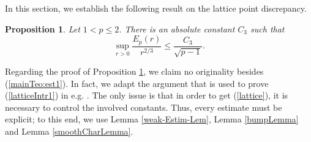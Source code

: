 \documentclass{amsart}
\newtheorem{prop}[theorem]{Proposition}
\numberwithin{equation}{section}
\begin{document}
In this section, we establish the following result on the lattice point discrepancy.
\begin{prop}\label{latticeProp}
Let $1<p\le2$. There is an absolute constant $C_3$ such that
   \begin{equation}
    \label{lattice}
    \sup_{r>0}\frac{E_p(r)}{r^{2/3}}\le\frac{C_3}{\sqrt{p-1}}.
\end{equation}
\end{prop}

Regarding the proof of Proposition \ref{latticeProp}, we claim no originality besides (\ref{mainTeo:est1}). In fact, we adapt the argument that is used to prove (\ref{latticeIntr1}) in e.g. \cite[Theorem 8.2]{SteinShak}. The only issue is that in order to get (\ref{lattice}), it is necessary to control the involved constants. Thus, every estimate must be explicit; to this end, we use Lemma \ref{weak-Estim-Lem}, Lemma \ref{bumpLemma} and Lemma \ref{smoothCharLemma}. 
\end{document}
